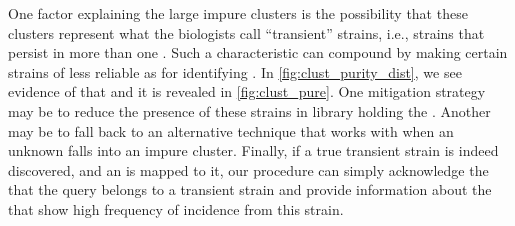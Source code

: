 One factor explaining the large impure clusters is the possibility that these
clusters represent what the  biologists call  ``transient'' strains, i.e., strains that 
persist in more than one \spec{}. 
Such a characteristic can compound \mst{} by making certain strains of \ecoli{} less reliable as \fib{} for identifying \spec{}.
In \autoref{fig:clust_purity_dist}, we see evidence of that and it is revealed in \autoref{fig:clust_pure}.
One mitigation strategy may be to reduce the presence of these strains in library holding the \fib{}.
Another may be to fall back to an alternative \mst{} technique that works with \cplop{} when an unknown \isol{} falls into an impure cluster.  Finally, if a true transient strain is indeed
discovered, and an \isol{} is mapped to it, our \mst{} procedure can simply acknowledge the
that the query \isol{} belongs to a transient strain and provide information about the \spec{}
that show high frequency of \ecoli{} incidence from this strain.



